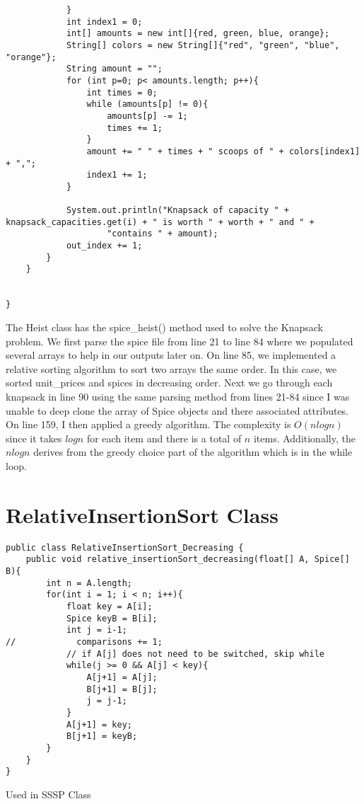 \documentclass{article}
\begin{document}
\begin{lstlisting}
            }
            int index1 = 0;
            int[] amounts = new int[]{red, green, blue, orange};
            String[] colors = new String[]{"red", "green", "blue", "orange"};
            String amount = "";
            for (int p=0; p< amounts.length; p++){
                int times = 0;
                while (amounts[p] != 0){
                    amounts[p] -= 1;
                    times += 1;
                }
                amount += " " + times + " scoops of " + colors[index1] + ",";
                index1 += 1;
            }

            System.out.println("Knapsack of capacity " + knapsack_capacities.get(i) + " is worth " + worth + " and " +
                    "contains " + amount);
            out_index += 1;
        }
    }


}

    \end{lstlisting}
    The Heist class has the spice\_heist() method used to solve the Knapsack problem.  We first parse the spice file from line 21 to line 84 where we populated several arrays to help in our outputs later on.  On line 85, we implemented a relative sorting algorithm to sort two arrays the same order. In this case, we sorted unit\_prices and spices in decreasing order. Next we go through each knapsack in line 90 using the same parsing method from lines 21-84 since I was unable to deep clone the array of Spice objects and there associated attributes.  On line 159,  I then applied a greedy algorithm. The complexity is $O(nlogn)$ since it takes $logn$ for each item and there is a total of $n$ items. Additionally, the $nlogn$ derives from the greedy choice part of the algorithm which is in the while loop.
    
\newpage
    
\section{RelativeInsertionSort Class}
    \begin{lstlisting}
public class RelativeInsertionSort_Decreasing {
    public void relative_insertionSort_decreasing(float[] A, Spice[] B){
        int n = A.length;
        for(int i = 1; i < n; i++){
            float key = A[i];
            Spice keyB = B[i];
            int j = i-1;
//            comparisons += 1;
            // if A[j] does not need to be switched, skip while
            while(j >= 0 && A[j] < key){
                A[j+1] = A[j];
                B[j+1] = B[j];
                j = j-1;
            }
            A[j+1] = key;
            B[j+1] = keyB;
        }
    }
}

    \end{lstlisting}
    Used in SSSP Class
    
\end{document}

